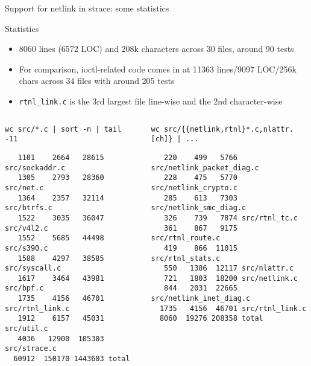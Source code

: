 \documentclass[unicode,aspectratio=169]{beamer}
\begin{document}
\begin{frame}[fragile]{Support for netlink in strace: some statistics}
\begin{block}{Statistics}
\begin{itemize}
  \item 8060 lines (6572 LOC) and 208k characters across 30 files, around 90 tests
  \item For comparison, ioctl-related code comes in at 11363 lines/9097 LOC/256k chars across 34 files with around 205 tests
  \item \texttt{rtnl\_link.c} is the 3rd largest file line-wise and the 2nd character-wise
\end{itemize}
\end{block}
\begin{columns}
\column{6cm}
\begin{block}{\scriptsize\texttt{wc src/*.c | sort -n | tail -11}}
\begin{scriptsize}
\begin{verbatim}
   1101    2664   28615 src/sockaddr.c
   1305    2793   28360 src/net.c
   1364    2357   32114 src/btrfs.c
   1522    3035   36047 src/v4l2.c
   1552    5685   44498 src/s390.c
   1588    4297   38585 src/syscall.c
   1617    3464   43981 src/bpf.c
   1735    4156   46701 src/rtnl_link.c
   1912    6157   45031 src/util.c
   4036   12900  105303 src/strace.c
  60912  150170 1443603 total
\end{verbatim}
\end{scriptsize}
\end{block}
\column{7cm}
\begin{block}{\scriptsize\texttt{wc src/\{\{netlink,rtnl\}*.c,nlattr.[ch]\} | ...}}
\begin{scriptsize}
\begin{verbatim}
   220    499   5766 src/netlink_packet_diag.c
   228    475   5770 src/netlink_crypto.c
   285    613   7303 src/netlink_smc_diag.c
   326    739   7874 src/rtnl_tc.c
   361    867   9175 src/rtnl_route.c
   419    866  11015 src/rtnl_stats.c
   550   1386  12117 src/nlattr.c
   721   1803  18200 src/netlink.c
   844   2031  22665 src/netlink_inet_diag.c
  1735   4156  46701 src/rtnl_link.c
  8060  19276 208358 total
\end{verbatim}
\end{scriptsize}
\end{block}
\end{columns}
\end{frame}
\end{document}
